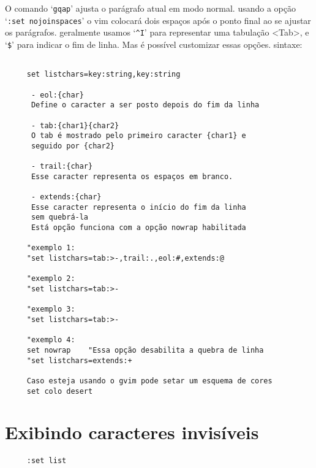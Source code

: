 O comando `\verb|gqap|' ajusta o parágrafo atual em modo normal. 
{\Large {}} usando a opção `{\tt :set nojoinspaces}' o vim 
colocará dois espaços após o ponto final ao se ajustar os parágrafos.
geralmente usamos `\verb+^I+' para representar uma tabulação        
<Tab>, e `\verb+$+' para indicar o fim de linha. Mas é possível     
customizar essas opções. sintaxe:                          

\begin{verbatim}
    
     set listchars=key:string,key:string                        

      - eol:{char} 
      Define o caracter a ser posto depois do fim da linha  

      - tab:{char1}{char2} 
      O tab é mostrado pelo primeiro caracter {char1} e     
      seguido por {char2}                                   

      - trail:{char}                                            
      Esse caracter representa os espaços em branco.        
                                                                
      - extends:{char}                                          
      Esse caracter representa o início do fim da linha      
      sem quebrá-la                                          
      Está opção funciona com a opção nowrap habilitada       
                                                                
     "exemplo 1:
     "set listchars=tab:>-,trail:.,eol:#,extends:@
     
     "exemplo 2:
     "set listchars=tab:>-
     
     "exemplo 3:
     "set listchars=tab:>-
     
     "exemplo 4:
     set nowrap    "Essa opção desabilita a quebra de linha
     "set listchars=extends:+
     
     Caso esteja usando o gvim pode setar um esquema de cores
     set colo desert
\end{verbatim}


\section{Exibindo caracteres invisíveis}
\label{Exibindo caracteres invisíveis}

\begin{verbatim}
     :set list
\end{verbatim}

